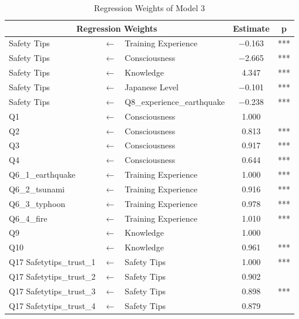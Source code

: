 \iffalse
\begin{table}[h]
\caption{Regression Weights of Model 3}
\label{table21}
\centering
\begin{tabular}{|l|c|l|c|c|}
\hline
\multicolumn{3}{|c|}{Regression Weights} & Estimate & p \\
\hline
Safety Tips & $\longleftarrow$ & Training Experience & $-$0.163 & *** \\
Safety Tips & $\longleftarrow$ & Consciousness & $-$2.665 & *** \\
Safety Tips & $\longleftarrow$ & Knowledge & 4.347 & *** \\
Safety Tips & $\longleftarrow$ & Japanese Level & $-$0.101 & *** \\
Safety Tips & $\longleftarrow$ & Q8\_experience\_earthquake & $-$0.238 & *** \\
Q1 & $\longleftarrow$ & Consciousness & 1.000 & \\
Q2 & $\longleftarrow$ & Consciousness & 0.813 & *** \\
Q3 & $\longleftarrow$ & Consciousness & 0.917 & *** \\
Q4 & $\longleftarrow$ & Consciousness & 0.644 & *** \\
Q6\_1\_earthquake & $\longleftarrow$ & Training Experience & 1.000 & *** \\
Q6\_2\_tsunami & $\longleftarrow$ & Training Experience & 0.916 & *** \\
Q6\_3\_typhoon & $\longleftarrow$ & Training Experience & 0.978 & *** \\
Q6\_4\_fire & $\longleftarrow$ & Training Experience & 1.010 & *** \\
Q9 & $\longleftarrow$ & Knowledge & 1.000 & \\
Q10 & $\longleftarrow$ & Knowledge & 0.961 & *** \\
Q17 Safetytips\_trust\_1 & $\longleftarrow$ & Safety Tips & 1.000 & *** \\
Q17 Safetytips\_trust\_2 & $\longleftarrow$ & Safety Tips & 0.902 & \\
Q17 Safetytips\_trust\_3 & $\longleftarrow$ & Safety Tips & 0.898 & *** \\
Q17 Safetytips\_trust\_4 & $\longleftarrow$ & Safety Tips & 0.879 & \\
\hline
\end{tabular}
\end{table}

